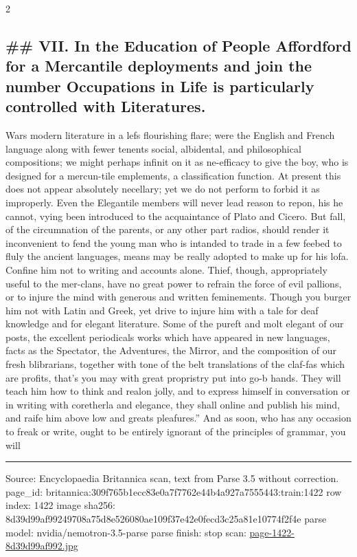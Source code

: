 \documentclass[10pt]{article}
\begin{document}
\begin{multicols}{2}
\subsection*{\#\# VII. In the Education of People Affordford for a Mercantile deployments and join the number Occupations in Life is particularly controlled with Literatures.}
Wars modern literature in a lefs flourishing flare; were the English and French language along with fewer tenents social, albidental, and philosophical compositions; we might perhaps infinit on it as ne-efficacy to give the boy, who is designed for a mercun-tile emplements, a classification function. At present this does not appear absolutely necellary; yet we do not perform to forbid it as improperly. Even the Elegantile members will never lead reason to repon, his he cannot, vying been introduced to the acquaintance of Plato and Cicero. But fall, of the circumnation of the parents, or any other part radios, should render it inconvenient to fend the young man who is intanded to trade in a few feebed to fluly the ancient languages, means may be really adopted to make up for his lofa. Confine him not to writing and accounts alone. Thief, though, appropriately useful to the mer-clans, have no great power to refrain the force of evil pallions, or to injure the mind with generous and written feminements. Though you burger him not with Latin and Greek, yet drive to injure him with a tale for deaf knowledge and for elegant literature. Some of the pureft and molt elegant of our posts, the excellent periodicals works which have appeared in new languages, facts as the Spectator, the Adventures, the Mirror, and the composition of our fresh blibrarians, together with tone of the belt translations of the claf-fas which are profits, that’s you may with great propristry put into go-b hands. They will teach him how to think and realon jolly, and to express himself in conversation or in writing with coretherla and elegance, they shall online and publish his mind, and raife him above low and greats pleafures.” And as soon, who has any occasion to freak or write, ought to be entirely ignorant of the principles of grammar, you will

\end{multicols}
\vfill\par\noindent\rule{\linewidth}{0.4pt}\par
{\scriptsize\color{gray}\noindent Source: Encyclopaedia Britannica scan, text from Parse 3.5 without correction. page\_id: britannica:309f765b1ecc83e0a7f7762e44b4a927a7555443:train:1422 \quad row index: 1422 \quad image sha256: 8d39d99af99249708a75d8e526080ae109f37e42e0fecd3c25a81e10774f2f4e \quad parse model: nvidia/nemotron-3.5-parse \quad parse finish: stop \quad scan: \href{../scans/page-1422-8d39d99af992.jpg}{page-1422-8d39d99af992.jpg}\par}
\end{document}
